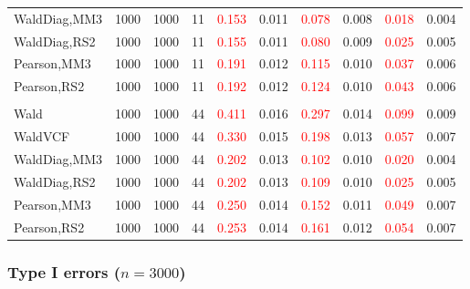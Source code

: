 \documentclass[
]{article}
\begin{document}
\begin{table}[H]
{\begin{tabular}[t]{lrrrrrrlrr}
\hspace{1em}WaldDiag,MM3 & 1000 & 1000 & 11 & \textcolor{red}{0.153} & 0.011 & \textcolor{red}{0.078} & 0.008 & \textcolor{red}{0.018} & 0.004\\
\hspace{1em}WaldDiag,RS2 & 1000 & 1000 & 11 & \textcolor{red}{0.155} & 0.011 & \textcolor{red}{0.080} & 0.009 & \textcolor{red}{0.025} & 0.005\\
\hspace{1em}Pearson,MM3 & 1000 & 1000 & 11 & \textcolor{red}{0.191} & 0.012 & \textcolor{red}{0.115} & 0.010 & \textcolor{red}{0.037} & 0.006\\
\hspace{1em}Pearson,RS2 & 1000 & 1000 & 11 & \textcolor{red}{0.192} & 0.012 & \textcolor{red}{0.124} & 0.010 & \textcolor{red}{0.043} & 0.006\\
\addlinespace[0.3em]
\multicolumn{10}{l}{\textbf{3F 15V}}\\
\hspace{1em}Wald & 1000 & 1000 & 44 & \textcolor{red}{0.411} & 0.016 & \textcolor{red}{0.297} & 0.014 & \textcolor{red}{0.099} & 0.009\\
\hspace{1em}WaldVCF & 1000 & 1000 & 44 & \textcolor{red}{0.330} & 0.015 & \textcolor{red}{0.198} & 0.013 & \textcolor{red}{0.057} & 0.007\\
\hspace{1em}WaldDiag,MM3 & 1000 & 1000 & 44 & \textcolor{red}{0.202} & 0.013 & \textcolor{red}{0.102} & 0.010 & \textcolor{red}{0.020} & 0.004\\
\hspace{1em}WaldDiag,RS2 & 1000 & 1000 & 44 & \textcolor{red}{0.202} & 0.013 & \textcolor{red}{0.109} & 0.010 & \textcolor{red}{0.025} & 0.005\\
\hspace{1em}Pearson,MM3 & 1000 & 1000 & 44 & \textcolor{red}{0.250} & 0.014 & \textcolor{red}{0.152} & 0.011 & \textcolor{red}{0.049} & 0.007\\
\hspace{1em}Pearson,RS2 & 1000 & 1000 & 44 & \textcolor{red}{0.253} & 0.014 & \textcolor{red}{0.161} & 0.012 & \textcolor{red}{0.054} & 0.007\\
\bottomrule
\end{tabular}}
\endgroup{}
\end{table}

\hypertarget{type-i-errors-n3000-1}{%
\subsubsection{\texorpdfstring{Type I errors
(\(n=3000\))}{Type I errors (n=3000)}}\label{type-i-errors-n3000-1}}
\end{document}
